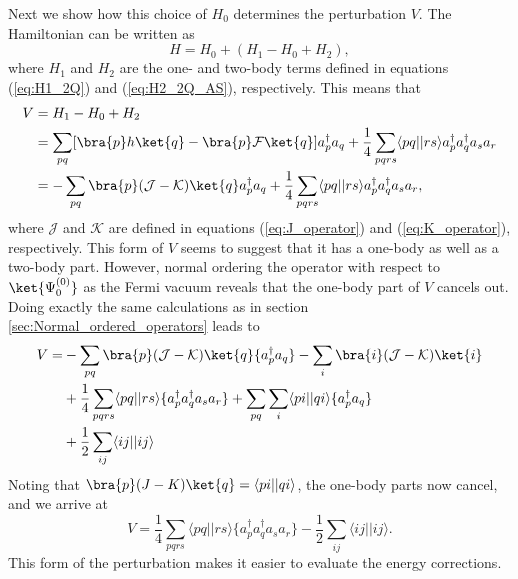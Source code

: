 Next we show how this choice of $H_0$ determines the perturbation $V$. The Hamiltonian can be written as
\begin{equation}
 H = H_0 + (H_1 - H_0 + H_2),
\end{equation}
where $H_1$ and $H_2$ are the one- and two-body terms defined in equations (\ref{eq:H1_2Q}) and (\ref{eq:H2_2Q_AS}), respectively.
This means that 
\begin{equation}
 \begin{split}
  V & = H_1 - H_0 + H_2 \\
    & = \sum_{pq}[\bra{p}h\ket{q} - \bra{p}\mathcal{F}\ket{q}]a^\dagger_p a_q + \frac{1}{4}\sum_{pqrs}\langle pq||rs\rangle a^\dagger_p a^\dagger_q a_s a_r \\
    & = -\sum_{pq}\bra{p}(\mathcal J - \mathcal K)\ket{q}a^\dagger_p a_q + \frac{1}{4}\sum_{pqrs}\langle pq||rs\rangle a^\dagger_p a^\dagger_q a_s a_r,
 \end{split}
\end{equation}
where $\mathcal J$ and $\mathcal K$ are defined in equations (\ref{eq:J_operator}) and (\ref{eq:K_operator}), respectively.
This form of $V$ seems to suggest that it has a one-body as well as a two-body part. However, normal ordering the operator with respect to $\ket{\Psi^{(0)}_0}$ as the Fermi vacuum
reveals that the one-body part of $V$ cancels out. Doing exactly the same calculations as in section \ref{sec:Normal_ordered_operators} leads to
\begin{equation}
 \begin{split}
  V  = & -\sum_{pq}\bra{p}(\mathcal J - \mathcal K)\ket{q}\{a^\dagger_p a_q\} - \sum_i\bra{i}(\mathcal J - \mathcal K)\ket{i} \\
       & + \frac{1}{4}\sum_{pqrs}\langle pq||rs\rangle \{a^\dagger_p a^\dagger_q a_s a_r\} + \sum_{pq}\sum_i \langle pi||qi\rangle \{a^\dagger_p a_q\} \\
       & + \frac{1}{2}\sum_{ij}\langle ij||ij\rangle
 \end{split}
\end{equation}
Noting that $\bra{p}(J - K)\ket{q} = \langle pi||qi\rangle$, the one-body parts now cancel, and we arrive at
\begin{equation}
\label{eq:V}
 V = \frac{1}{4}\sum_{pqrs}\langle pq||rs\rangle \{a^\dagger_p a^\dagger_q a_s a_r\} - \frac{1}{2}\sum_{ij}\langle ij||ij\rangle.
\end{equation}
This form of the perturbation makes it easier to evaluate the energy corrections.

